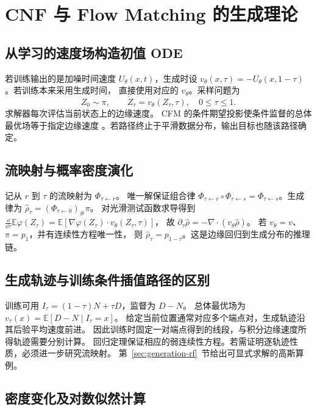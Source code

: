 \section{CNF 与 Flow Matching 的生成理论}
\label{sec:generation-fm}

\subsection{从学习的速度场构造初值 ODE}

若训练输出的是加噪时间速度 \(U_\theta(x,t)\)，生成时设
\(v_\theta(x,\tau)=-U_\theta(x,1-\tau)\)。若训练本来采用生成时间，
直接使用对应的 \(v_\theta\)。采样问题为
\begin{equation}
 Z_0\sim\pi,\qquad \dot Z_\tau=v_\theta(Z_\tau,\tau),\quad 0\le\tau\le1.
 \label{eq:generation-fm-ode}
\end{equation}
求解器每次评估当前状态上的边缘速度。
CFM 的条件期望投影使条件监督的总体最优场等于指定边缘速度
\cite{lipman2023fm}。若路径终止于平滑数据分布，输出目标也随该路径确定。

\subsection{流映射与概率密度演化}

记从 \(r\) 到 \(\tau\) 的流映射为 \(\Phi_{\tau\leftarrow r}\)。
唯一解保证组合律 \(\Phi_{\tau\leftarrow r}\circ\Phi_{r\leftarrow s}
=\Phi_{\tau\leftarrow s}\)。生成律为
\(\widehat\rho_\tau=(\Phi_{\tau\leftarrow0})_\#\pi\)。
对光滑测试函数求导得到
\(\frac{\dd}{\dd\tau}\mathbb E\varphi(Z_\tau)
=\mathbb E[\nabla\varphi(Z_\tau)\cdot v_\theta(Z_\tau,\tau)]\)，
故 \(\partial_\tau\widehat\rho=-\nabla\cdot(v_\theta\widehat\rho)\)。
若 \(v_\theta=v\)、\(\pi=p_1\)，并有连续性方程唯一性，
则 \(\widehat\rho_\tau=p_{1-\tau}\)。这是边缘回归到生成分布的推理链。

\subsection{生成轨迹与训练条件插值路径的区别}

训练可用 \(I_\tau=(1-\tau)N+\tau D\)，监督为 \(D-N\)。
总体最优场为 \(v_\tau(x)=\mathbb E[D-N\mid I_\tau=x]\)。
给定当前位置通常对应多个端点对，生成轨迹沿其后验平均速度前进。
因此训练时固定一对端点得到的线段，与积分边缘速度所得轨迹需要分别计算。
回归定理保证相应的弱连续性方程。若需证明逐轨迹性质，必须进一步研究流映射。
第~\ref{sec:generation-rf}~节给出可显式求解的高斯算例。

\subsection{密度变化及对数似然计算}


